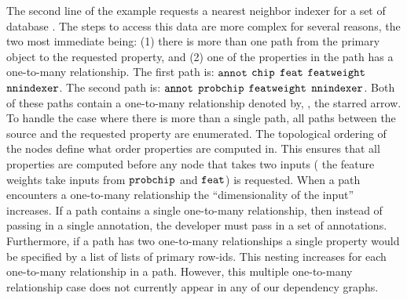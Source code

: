        The second line of the example requests a nearest neighbor indexer for
          a set of database \annots{}.
        The steps to access this data are more complex for several reasons,
          the two most immediate being:
        (1) there is more than one path from the primary object to the
          requested property, and
        (2) one of the properties in the path has a one-to-many relationship.
        The first path is:
        $\tt{annot}$ \rarrow{} $\tt{chip}$ \rarrow{} $\tt{feat}$ \rarrow{}
          $\tt{featweight}$ \rmultiarrow{} $\tt{nnindexer}$.
        The second path is:
        $\tt{annot}$ \rarrow{} $\tt{probchip}$ \rarrow{} $\tt{featweight}$
          \rmultiarrow{} $\tt{nnindexer}$.
        Both of these paths contain a one-to-many relationship denoted by,
          \rmultiarrow{}, the starred arrow.
        To handle the case where there is more than a single path, all paths
          between the source and the requested property are enumerated.
        The topological ordering of the nodes define what order properties are
          computed in.
        This ensures that all properties are computed before any node that
          takes two inputs (\eg{} the feature weights take inputs from
          $\tt{probchip}$ and $\tt{feat}$) is requested.
        When a path encounters a one-to-many relationship the ``dimensionality
          of the input'' increases.
        If a path contains a single one-to-many relationship, then instead of
          passing in a single annotation, the developer must pass in a set of
          annotations.
        Furthermore, if a path has two one-to-many relationships a single
          property would be specified by a list of lists of primary row-ids.
        This nesting increases for each one-to-many relationship in a path.
        However, this multiple one-to-many relationship case does not
          currently appear in any of our dependency graphs.

